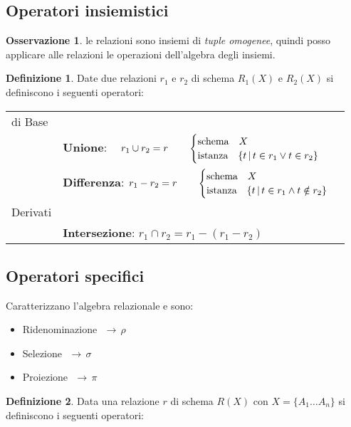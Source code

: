 \documentclass[a4paper, 10pt]{article}
\theoremstyle{definition}
\newtheorem*{oss}{Osservazione}
\newtheorem*{defn}{Definizione}
\begin{document}
		\subsection{Operatori insiemistici}
			\begin{oss}
				le relazioni sono insiemi di \textit{tuple omogenee}, quindi posso applicare alle relazioni le operazioni dell'algebra degli insiemi.				
			\end{oss}

			\begin{defn}
				Date due relazioni $r_1$ e $r_2$ di schema $R_1(X)$ e $R_2(X)$ si definiscono i seguenti operatori:
			\end{defn}
			\begin{tabular}{ll}
				di Base & \\
						& \textbf{Unione}: $\quad r_1 \cup r_2 = r \qquad
						\begin{cases}
							\textup{schema}\quad X \\
							\textup{istanza} \quad \{ t \, | \, t \in r_1 \vee t \in r_2 \}
						\end{cases}$ \\ [1cm]
						& \textbf{Differenza}: $r_1 - r_2 = r  \qquad
						\begin{cases}
							\textup{schema}\quad X \\
							\textup{istanza} \quad \{ t \, | \, t \in r_1 \wedge t \notin r_2 \}
						\end{cases}$ \\ [1cm]
				Derivati & \\ 
						 & \textbf{Intersezione}: $ r_1 \cap r_2 = r_1 - (r_1 - r_2)$
			\end{tabular}

		\subsection{Operatori specifici}
			Caratterizzano l'algebra relazionale e sono:
			\begin{itemize}
				\item Ridenominazione $\, \, \rightarrow \, \rho $
				\item Selezione $\, \, \rightarrow \, \sigma $
				\item Proiezione $\, \, \rightarrow \, \pi $
			\end{itemize}
			\begin{defn}
				Data una relazione $r$ di schema $R(X)$ con $X = \{ A_1 \dots A_n \}$ si definiscono i seguenti operatori: 
			\end{defn}
\end{document}
